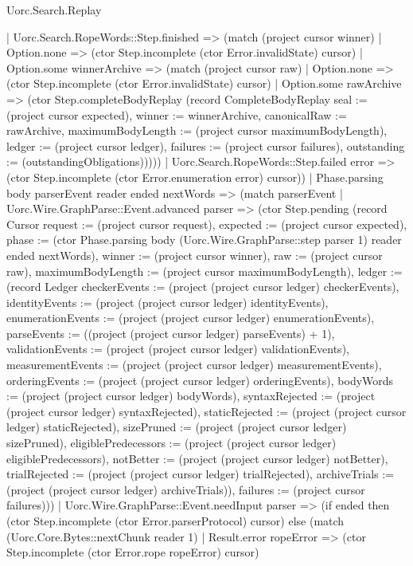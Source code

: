 \begin{lexlean}{Uorc.Search.Replay}
\begin{semanticmodule}
{      | Uorc.Search.RopeWords::Step.finished => (match (project cursor winner)
        | Option.none => (ctor Step.incomplete (ctor Error.invalidState) cursor)
        | Option.some winnerArchive => (match (project cursor raw)
          | Option.none => (ctor Step.incomplete (ctor Error.invalidState) cursor)
          | Option.some rawArchive => (ctor Step.completeBodyReplay (record CompleteBodyReplay {seal := (project cursor expected), winner := winnerArchive, canonicalRaw := rawArchive, maximumBodyLength := (project cursor maximumBodyLength), ledger := (project cursor ledger), failures := (project cursor failures), outstanding := (outstandingObligations)}))))
      | Uorc.Search.RopeWords::Step.failed error => (ctor Step.incomplete (ctor Error.enumeration error) cursor))
    | Phase.parsing body parserEvent reader ended nextWords => (match parserEvent
      | Uorc.Wire.GraphParse::Event.advanced parser => (ctor Step.pending (record Cursor {request := (project cursor request), expected := (project cursor expected), phase := (ctor Phase.parsing body (Uorc.Wire.GraphParse::step parser 1) reader ended nextWords), winner := (project cursor winner), raw := (project cursor raw), maximumBodyLength := (project cursor maximumBodyLength), ledger := (record Ledger {checkerEvents := (project (project cursor ledger) checkerEvents), identityEvents := (project (project cursor ledger) identityEvents), enumerationEvents := (project (project cursor ledger) enumerationEvents), parseEvents := ((project (project cursor ledger) parseEvents) + 1), validationEvents := (project (project cursor ledger) validationEvents), measurementEvents := (project (project cursor ledger) measurementEvents), orderingEvents := (project (project cursor ledger) orderingEvents), bodyWords := (project (project cursor ledger) bodyWords), syntaxRejected := (project (project cursor ledger) syntaxRejected), staticRejected := (project (project cursor ledger) staticRejected), sizePruned := (project (project cursor ledger) sizePruned), eligiblePredecessors := (project (project cursor ledger) eligiblePredecessors), notBetter := (project (project cursor ledger) notBetter), trialRejected := (project (project cursor ledger) trialRejected), archiveTrials := (project (project cursor ledger) archiveTrials)}), failures := (project cursor failures)}))
      | Uorc.Wire.GraphParse::Event.needInput parser => (if ended then (ctor Step.incomplete (ctor Error.parserProtocol) cursor) else (match (Uorc.Core.Bytes::nextChunk reader 1)
        | Result.error ropeError => (ctor Step.incomplete (ctor Error.rope ropeError) cursor)
}
\end{semanticmodule}
\end{lexlean}
